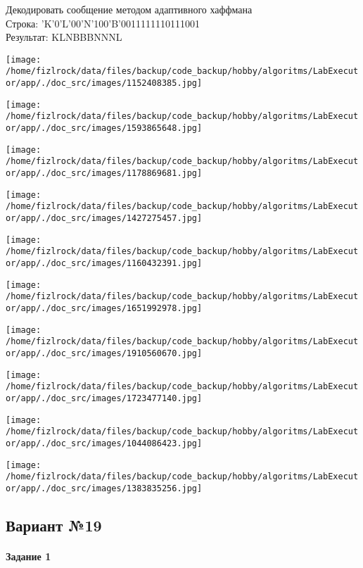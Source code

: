 \documentclass[a4paper, 12pt]{article}
\begin{document}
Декодировать сообщение методом адаптивного хаффмана \\
Строка: 
'K'0'L'00'N'100'B'0011111110111001\\
Результат: KLNBBBNNNL

\texttt{[image: /home/fizlrock/data/files/backup/code\_backup/hobby/algoritms/LabExecutor/app/./doc\_src/images/1152408385.jpg]}

\texttt{[image: /home/fizlrock/data/files/backup/code\_backup/hobby/algoritms/LabExecutor/app/./doc\_src/images/1593865648.jpg]}

\texttt{[image: /home/fizlrock/data/files/backup/code\_backup/hobby/algoritms/LabExecutor/app/./doc\_src/images/1178869681.jpg]}

\texttt{[image: /home/fizlrock/data/files/backup/code\_backup/hobby/algoritms/LabExecutor/app/./doc\_src/images/1427275457.jpg]}

\texttt{[image: /home/fizlrock/data/files/backup/code\_backup/hobby/algoritms/LabExecutor/app/./doc\_src/images/1160432391.jpg]}

\texttt{[image: /home/fizlrock/data/files/backup/code\_backup/hobby/algoritms/LabExecutor/app/./doc\_src/images/1651992978.jpg]}

\texttt{[image: /home/fizlrock/data/files/backup/code\_backup/hobby/algoritms/LabExecutor/app/./doc\_src/images/1910560670.jpg]}

\texttt{[image: /home/fizlrock/data/files/backup/code\_backup/hobby/algoritms/LabExecutor/app/./doc\_src/images/1723477140.jpg]}

\texttt{[image: /home/fizlrock/data/files/backup/code\_backup/hobby/algoritms/LabExecutor/app/./doc\_src/images/1044086423.jpg]}

\texttt{[image: /home/fizlrock/data/files/backup/code\_backup/hobby/algoritms/LabExecutor/app/./doc\_src/images/1383835256.jpg]}
\pagebreak
\subsection{Вариант №19}
\paragraph{Задание 1}
\end{document}
